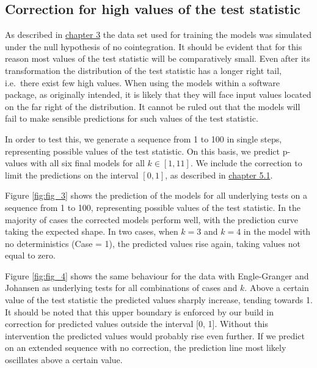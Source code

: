 \documentclass[12pt,a4paper]{article}
\begin{document}
\hypertarget{correction-for-high-values-of-the-test-statistic}{%
\subsection{Correction for high values of the test
statistic}\label{correction-for-high-values-of-the-test-statistic}}

As described in \protect\hyperlink{simulation}{chapter 3} the data set
used for training the models was simulated under the null hypothesis of
no cointegration. It should be evident that for this reason most values
of the test statistic will be comparatively small. Even after its
transformation the distribution of the test statistic has a longer right
tail, i.e.~there exist few high values. When using the models within a
software package, as originally intended, it is likely that they will
face input values located on the far right of the distribution. It
cannot be ruled out that the models will fail to make sensible
predictions for such values of the test statistic.

In order to test this, we generate a sequence from 1 to 100 in single
steps, representing possible values of the test statistic. On this
basis, we predict p-values with all six final models for all
\(k \in [1, 11]\). We include the correction to limit the predictions on
the interval \([0, 1]\), as described in
\protect\hyperlink{rmse-comparison}{chapter 5.1}.

Figure \ref{fig:fig_3} shows the prediction of the models for all
underlying tests on a sequence from 1 to 100, representing possible
values of the test statistic. In the majority of cases the corrected
models perform well, with the prediction curve taking the expected
shape. In two cases, when \(k = 3\) and \(k = 4\) in the model with no
deterministics (Case = 1), the predicted values rise again, taking
values not equal to zero.

Figure \ref{fig:fig_4} shows the same behaviour for the data with
Engle-Granger and Johansen as underlying tests for all combinations of
cases and \(k\). Above a certain value of the test statistic the
predicted values sharply increase, tending towards 1. It should be noted
that this upper boundary is enforced by our build in correction for
predicted values outside the interval {[}0, 1{]}. Without this
intervention the predicted values would probably rise even further. If
we predict on an extended sequence with no correction, the prediction
line most likely oscillates above a certain value.
\end{document}
